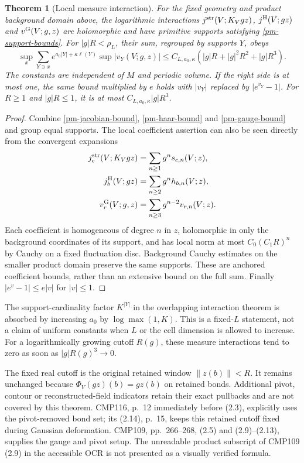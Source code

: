 \documentclass[11pt]{article}
\newtheorem{theorem}{Theorem}[section]
\theoremstyle{remark}
\begin{document}
\begin{theorem}[Local measure interaction]\label{pm-measure-theorem}
For the fixed geometry and product background domain above,
the logarithmic interactions
$j^{\rm str}(V;K_Vgz)$, $j^{\rm H}(V;gz)$ and
$v^{\rm G}(V;g,z)$ are holomorphic and have primitive
supports satisfying \eqref{pm-support-bounds}. For
$|g|R<\rho_L$, their sum, regrouped by supports $Y$, obeys
\begin{equation}\label{pm-combined-bound}
 \sup_x\sum_{Y\ni x}e^{a_0|Y|+\kappa\ell(Y)}
 \sup|v_Y(V;g,z)|
 \le C_{L,a_0,\kappa}
   (|g|R+|g|^2R^2+|g|R^3).
\end{equation}
The constants are independent of $M$ and periodic volume.
If the right side is at most one, the same bound multiplied
by $e$ holds with $|v_Y|$ replaced by $|e^{v_Y}-1|$.
For $R\ge1$ and $|g|R\le1$, it is at most
$C_{L,a_0,\kappa}|g|R^3$.
\end{theorem}
\begin{proof}
Combine \eqref{pm-jacobian-bound},
\eqref{pm-haar-bound} and \eqref{pm-gauge-bound} and group
equal supports. The local coefficient assertion can also
be seen directly from the convergent expansions
\[
 \begin{split}
 j_c^{\rm str}(V;K_Vgz)&=\sum_{n\ge1}g^n s_{c,n}(V;z),\\
 j_b^{\rm H}(V;gz)&=\sum_{n\ge2}g^n h_{b,n}(V;z),\\
 v_r^{\rm G}(V;g,z)&=\sum_{n\ge3}g^{n-2}v_{r,n}(V;z).
 \end{split}
\]
Each coefficient is homogeneous of degree $n$ in $z$,
holomorphic in only the background coordinates of its support,
and has local norm at most $C_0(C_1R)^n$ by Cauchy on a
fixed fluctuation disc. Background Cauchy estimates on the
smaller product domain preserve the same supports. These are
anchored coefficient bounds, rather than an extensive bound
on the full sum. Finally $|e^v-1|\le e|v|$ for $|v|\le1$.
\end{proof}

The support-cardinality factor $K^{|Y|}$ in the overlapping
interaction theorem is absorbed by increasing $a_0$ by
$\log\max(1,K)$. This is a fixed-$L$ statement, not a
claim of uniform constants when $L$ or the cell dimension is
allowed to increase. For a logarithmically growing cutoff
$R(g)$, these measure interactions tend to zero as soon as
$|g|R(g)^3\to0$.

The fixed real cutoff is the original retained window
$\|z(b)\|<R$. It remains unchanged because
$\Phi_V(gz)(b)=gz(b)$ on retained bonds. Additional pivot,
contour or reconstructed-field indicators retain their exact
pullbacks and are not covered by this theorem. CMP116,
p.~12 immediately before (2.3), explicitly uses the
pivot-removed bond set; its (2.14), p.~15, keeps this retained
cutoff fixed during Gaussian deformation. CMP109,
pp.~266--268, (2.5) and (2.9)--(2.13), supplies the gauge
and pivot setup. The unreadable product subscript of
CMP109 (2.9) in the accessible OCR is not presented as a
visually verified formula.
\end{document}
